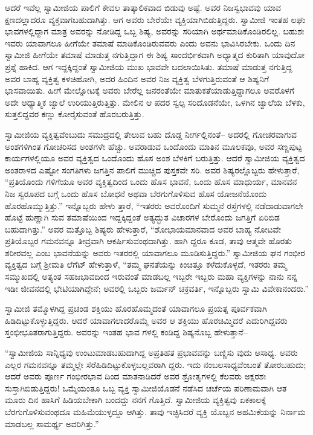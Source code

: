 ಆದರೆ ಇವೆಲ್ಲ ಸ್ವಾಮೀಜಿಯ ಪಾಲಿಗೆ ಕೇವಲ ತಾತ್ಕಾಲಿಕವಾದ ಬಿಡುವು ಅಷ್ಟೆ. ಅವರ ನಿಜಸ್ವಭಾವವು ಯಾವ ಕ್ಷಣದಲ್ಲಾದರೂ ವ್ಯಕ್ತವಾಗಬಹುದಾಗಿತ್ತು. ಆಗ ಅವರು ಬೇರೆಯೇ ವ್ಯಕ್ತಿಯಾಗಿಬಿಡುತ್ತಿದ್ದರು. ಸ್ವಾಮೀಜಿ ಇಂತಹ ಲಘು ಭಾವಗಳಲ್ಲಿದ್ದಾಗ ಮಾತ್ರ ಅವರನ್ನು ನೋಡಿದ್ದ ಒಬ್ಬ ಶಿಷ್ಯ, ಅವರನ್ನು ಸರಿಯಾಗಿ ಅರ್ಥಮಾಡಿಕೊಂಡಿರಲಿಲ್ಲ. ಬಹುಶಃ ಇವರು ಯಾವಾಗಲೂ ಹೀಗೆಯೇ ತಮಾಷೆ ಮಾಡಿಕೊಂಡಿರುವವರು ಎಂದು ಅವನು ಭಾವಿಸಿರಬೇಕು. ಒಂದು ದಿನ ಸ್ವಾಮೀಜಿ ಹೀಗೆಯೇ ತಮಾಷೆ ಮಾಡುತ್ತ ನಗುತ್ತಿದ್ದಾಗ ಈ ಶಿಷ್ಯ ಸಾಂದರ್ಭಿಕವಾಗಿ ಅಧ್ಯಾತ್ಮದ ಕುರಿತಾಗಿ ಯಾವುದೋ ಪ್ರಶ್ನೆ ಹಾಕಿದ. ಆಗ ಇದ್ದಕ್ಕಿದ್ದಂತೆ ಸ್ವಾಮೀಜಿಯ ಮುಖ ಭಾವವೇ ಬದಲಾಯಿಸಿತು. ತಮಾಷೆ ಮಾಡುತ್ತ ನಗುತ್ತಿದ್ದ ಅವರ ಬಾಹ್ಯ ವ್ಯಕ್ತಿತ್ವ ಕಳಚಿಹೋಗಿ, ಅದರ ಹಿಂದಿನ ಅವರ ನಿಜ ವ್ಯಕ್ತಿತ್ವ ಬೆಳಗುತ್ತಿರುವಂತೆ ಆ ಶಿಷ್ಯನಿಗೆ ಭಾಸವಾಯಿತು. ಹೀಗೆ ಮೇಲ್ನೋಟಕ್ಕೆ ಅವರು ಬೇರೆಲ್ಲ ಜನರಂತೆಯೇ ಮಾತುಕತೆಯಾಡುತ್ತಿದ್ದಾಗಲೂ ಅವರೊಳಗೆ ಅದೇ ಆಧ್ಯಾತ್ಮಿಕ ಜ್ವಾಲೆ ಉರಿಯುತ್ತಿರುತ್ತಿತ್ತು. ಮೇಲಿನ ಆ ಪದರ ಸ್ವಲ್ಪ ಸರಿದೊಡನೆಯೇ, ಒಳಗಿನ ಜ್ವಾಲೆಯ ಬೆಳಕು, ಸುತ್ತಲಿದ್ದವರ ಕಣ್ಣು ಕೋರೈಸುವಂತೆ ಹೊರಬರುತ್ತಿತ್ತು.

ಸ್ವಾಮೀಜಿಯ ವ್ಯಕ್ತಿತ್ವವೆಂಬುದು ಸಮುದ್ರದಲ್ಲಿ ತೇಲುವ ಬಹು ದೊಡ್ಡ ನೀರ್ಗಲ್ಲಿನಂತೆ– ಅದರಲ್ಲಿ ಗೋಚರವಾಗುವ ಅಂಶಗಳಿಗಿಂತ ಗೋಚರಿಸದ ಅಂಶಗಳೇ ಹೆಚ್ಚು. ಅವರಾಡುವ ಒಂದೊಂದು ಮಾತಿನ ಮೂಲಕವೂ, ಅವರ ಸಣ್ಣಪುಟ್ಟ ಕಾರ್ಯಗಳಲ್ಲಿಯೂ ಅವರ ವ್ಯಕ್ತಿತ್ವದ ಒಂದೊಂದು ಹೊಸ ಅಂಶ ಬೆಳಕಿಗೆ ಬರುತ್ತಿತ್ತು. ಆದರೆ ಸ್ವಾಮೀಜಿಯ ವ್ಯಕ್ತಿತ್ವದ ಅಂತರಾಳದ ಎಷ್ಟೋ ಸಂಗತಿಗಳು ಜಗತ್ತಿನ ಪಾಲಿಗೆ ಮುಚ್ಚಿದ ಪುಸ್ತಕವೇ ಸರಿ. ಅವರ ಶಿಷ್ಯರಲ್ಲೊಬ್ಬರು ಹೇಳುತ್ತಾರೆ, “ಪ್ರತಿಯೊಂದು ಗಳಿಗೆಯೂ ಅವರ ವ್ಯಕ್ತಿತ್ವದಿಂದ ಒಂದು ಹೊಸ ಭಾವನೆ, ಒಂದು ಹೊಸ ಮಾಧುರ್ಯ, ಮಾನವನ ನಿಜ ಸ್ವರೂಪದ ಬಗ್ಗೆ ಒಂದು ಹೊಸ ಬೋಧನೆ ಅಥವಾ ಬೆರಗುಗೊಳಿಸುವ ಹೊಸ ಯೋಜನೆಯೊಂದು ಹೊರಹೊಮ್ಮುತ್ತಿತ್ತು.” ಇನ್ನೊಬ್ಬರು ಹೇಳು ತ್ತಾರೆ, “ಇತರರು ಅವರೊಂದಿಗೆ ಸುಮ್ಮನೆ ರಸ್ತೆಗಳಲ್ಲಿ ನಡೆದಾಡುವಾಗಲೇ ಹೊಟ್ಟೆ ಹುಣ್ಣಾಗಿ ಸುವ ತಮಾಷೆಯಿಂದ ಇದ್ದಕ್ಕಿದ್ದಂತೆ ಅತ್ಯದ್ಭುತ ವಿಚಾರಗಳ ಬೇರೊಂದು ಜಗತ್ತಿಗೆ ಏರಿಬಿಡ ಬಹುದಾಗಿತ್ತು.” ಅವರ ಮತ್ತೊಬ್ಬ ಶಿಷ್ಯರು ಹೇಳುತ್ತಾರೆ, “ಶೋಭಾಯಮಾನವಾದ ಅವರ ಬಾಹ್ಯ ನೋಟವೇ ಪ್ರತಿಯೊಬ್ಬರ ಗಮನವನ್ನೂ ತೀವ್ರವಾಗಿ ಆಕರ್ಷಿಸುವಂಥದಾಗಿತ್ತು. ಹಾಗಿ ದ್ದರೂ ಕೂಡ, ತಾವು ಆತ್ಮವೇ ಹೊರತು ಶರೀರವಲ್ಲ ಎಂಬ ಭಾವನೆಯನ್ನು ಅವರು ಇತರರಲ್ಲಿ ಯಾವಾಗಲೂ ಮೂಡಿಸುತ್ತಿದ್ದರು.” ಸ್ವಾಮೀಜಿಯ ಘನ ಗಂಭೀರ ವ್ಯಕ್ತಿತ್ವದ ಬಗ್ಗೆ ಶ್ರೀಮತಿ ಲೆಗೆಟ್ ಹೇಳುತ್ತಾಳೆ, “ತಮ್ಮ ಘನತೆಯನ್ನು ಕಿಂಚಿತ್ತೂ ಕಳೆದುಕೊಳ್ಳದೆ, ಇತರರು ತಮ್ಮ ಸಮ್ಮುಖದಲ್ಲಿ ಅತ್ಯಂತ ಸಹಜಭಾವದಿಂದ ಇರುವಂತೆ ಮಾಡಬಲ್ಲ ಇಬ್ಬರೇ ಇಬ್ಬರು ಮಹಾ ವ್ಯಕ್ತಿಗಳನ್ನು ನಾನು ನನ್ನ ಇಡೀ ಜೀವನದಲ್ಲಿ ಭೇಟಿಯಾಗಿದ್ದೇನೆ; ಅವರಲ್ಲಿ ಒಬ್ಬರು ಜರ್ಮನ್ ಚಕ್ರವರ್ತಿ, ಇನ್ನೊಬ್ಬರು ಸ್ವಾಮಿ ವಿವೇಕಾನಂದರು.”

ಸ್ವಾಮೀಜಿ ತಮ್ಮೊಳಗಿದ್ದ ಪ್ರಚಂಡ ಶಕ್ತಿಯು ಹೊರಹೊಮ್ಮದಂತೆ ಯಾವಾಗಲೂ ಪ್ರಯತ್ನ ಪೂರ್ವಕವಾಗಿ ಹಿಡಿದಿಟ್ಟುಕೊಳ್ಳುತ್ತಿದ್ದರು. ಆದರೆ ಯಾವಾಗಲಾದರೊಮ್ಮೆ ಅವರ ಆ ಶಕ್ತಿಯು ಹೊರಚಿಮ್ಮಿದರೆ ಎದುರಿಗಿದ್ದವರು ಸ್ತಂಭೀಭೂತರಾಗುತ್ತಿದ್ದರು. ಅವರನ್ನು ಇಂತಹ ಭಾವ ಗಳಲ್ಲಿ ಕಂಡಿದ್ದ ಶಿಷ್ಯನೊಬ್ಬ ಹೇಳುತ್ತಾನೆ–

“ಸ್ವಾಮೀಜಿಯ ಸಾನ್ನಿಧ್ಯವು ಉಂಟುಮಾಡಬಹುದಾಗಿದ್ದ ಅಪ್ರತಿಹತ ಪ್ರಭಾವವನ್ನು ಬಣ್ಣಿಸು ವುದು ಅಸಾಧ್ಯ. ಅವರು ಎಲ್ಲರ ಗಮನವನ್ನೂ ತಮ್ಮಲ್ಲೇ ಸೆರೆಹಿಡಿದಿಟ್ಟುಕೊಳ್ಳಬಲ್ಲವರಾಗಿ ದ್ದರು. ಇದು ನಂಬಲಸಾಧ್ಯವೆಂಬಂತೆ ತೋರಬಹುದು; ಆದರೆ ಅವರು ಪೂರ್ಣ ಗಂಭೀರಭಾವ ದಿಂದ ಮಾತನಾಡಿದರೆ ಅವರ ಶ್ರೋತೃಗಳಲ್ಲಿ ಕೆಲವರು ಅಕ್ಷರಶಃ ಸುಸ್ತಾಗಿಬಿಡುತ್ತಿದ್ದರು! ಒಮ್ಮೆಯಂತೂ ಒಬ್ಬ ವ್ಯಕ್ತಿ ಸ್ವಾಮೀಜಿಯೊಡನೆ ನಡೆಸಿದ ಚರ್ಚೆಯ ಪರಿಣಾಮವಾಗಿ ಆತ ಮೂರು ದಿನ ಹಾಸಿಗೆ ಹಿಡಿಯಬೇಕಾಗಿ ಬಂದದ್ದು ನನಗೆ ಗೊತ್ತಿದೆ. ಸ್ವಾಮೀಜಿಯ ವ್ಯಕ್ತಿತ್ವವು ಏಕಕಾಲಕ್ಕೆ ಬೆರಗುಗೊಳಿಸುವಂಥದೂ ಮಹಿಮೆಯುಳ್ಳದ್ದೂ ಆಗಿತ್ತು. ತಾವು ಇಚ್ಛಿಸಿದರೆ ವ್ಯಕ್ತಿ ಯೊಬ್ಬನ ಅಹಮಿಕೆಯನ್ನು ನಿರ್ನಾಮ ಮಾಡಬಲ್ಲ ಸಾಮರ್ಥ್ಯ ಅವರಿಗಿತ್ತು.”


